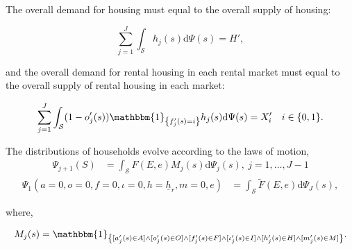 \documentclass[parskip=full]{article}
\newcommand{\indicator}[1]{\mathbbm{1}_{\left\{ {#1} \right\} }}
\begin{document}
The overall demand for housing must equal to the overall supply of housing:

\begin{equation}
\label{eq:housing_clearing_condition}
  \sum_{j=1}^J \int_\mathcal{S} h_{j}(s) \mathrm{d}\Psi(s) = H',
\end{equation}

\noindent and the overall demand for rental housing in each rental market must equal to the overall supply of rental housing in each market:

\begin{equation}
\label{eq:rental_housing_clearing_condition}
  \sum_{j=1}^J \int_\mathcal{S} (1-o'_{j}(s))\indicator{f'_{j}(s)=i}h_{j}(s) \mathrm{d}\Psi(s) = X'_{i} \quad i \in \{0,1\}.
\end{equation}

The distributions of households evolve according to the laws of motion,
\begin{align}
\Psi_{j+1}(S) &=\int_{\mathcal{S}} F(E,e)M_{j}(s)\mathrm{d}\Psi_{j}(s),\ j=1,\ldots,J-1\label{eq:lom1}
\end{align}
\begin{align}
\Psi_{1}(a=0,o=0,f=0,\iota=0,h=\underline{h}_{r},m=0,e) &=\int_{\mathcal{S}}\tilde{F}(E,e) \mathrm{d}\Psi_{J}(s),\label{eq:lom2}
\end{align}

\noindent where,

\begin{align}
    M_{j}(s) = \indicator{[a'_{j}(s)\in A] \land [o'_{j}(s)\in O] \land [f'_{j}(s)\in F] \land [\iota'_{j}(s)\in I] \land [h'_{j}(s) \in H] \land [m'_{j}(s) \in M]}.\notag
\end{align}
\end{document}
